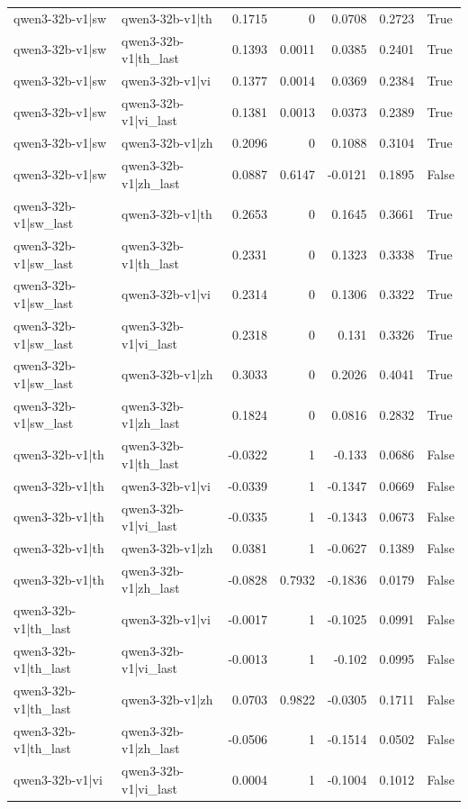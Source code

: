 \begin{table}
\begin{tabular}{l l r r r r l}
qwen3-32b-v1|sw & qwen3-32b-v1|th & 0.1715 & 0 & 0.0708 & 0.2723 & True \\
qwen3-32b-v1|sw & qwen3-32b-v1|th_last & 0.1393 & 0.0011 & 0.0385 & 0.2401 & True \\
qwen3-32b-v1|sw & qwen3-32b-v1|vi & 0.1377 & 0.0014 & 0.0369 & 0.2384 & True \\
qwen3-32b-v1|sw & qwen3-32b-v1|vi_last & 0.1381 & 0.0013 & 0.0373 & 0.2389 & True \\
qwen3-32b-v1|sw & qwen3-32b-v1|zh & 0.2096 & 0 & 0.1088 & 0.3104 & True \\
qwen3-32b-v1|sw & qwen3-32b-v1|zh_last & 0.0887 & 0.6147 & -0.0121 & 0.1895 & False \\
qwen3-32b-v1|sw_last & qwen3-32b-v1|th & 0.2653 & 0 & 0.1645 & 0.3661 & True \\
qwen3-32b-v1|sw_last & qwen3-32b-v1|th_last & 0.2331 & 0 & 0.1323 & 0.3338 & True \\
qwen3-32b-v1|sw_last & qwen3-32b-v1|vi & 0.2314 & 0 & 0.1306 & 0.3322 & True \\
qwen3-32b-v1|sw_last & qwen3-32b-v1|vi_last & 0.2318 & 0 & 0.131 & 0.3326 & True \\
qwen3-32b-v1|sw_last & qwen3-32b-v1|zh & 0.3033 & 0 & 0.2026 & 0.4041 & True \\
qwen3-32b-v1|sw_last & qwen3-32b-v1|zh_last & 0.1824 & 0 & 0.0816 & 0.2832 & True \\
qwen3-32b-v1|th & qwen3-32b-v1|th_last & -0.0322 & 1 & -0.133 & 0.0686 & False \\
qwen3-32b-v1|th & qwen3-32b-v1|vi & -0.0339 & 1 & -0.1347 & 0.0669 & False \\
qwen3-32b-v1|th & qwen3-32b-v1|vi_last & -0.0335 & 1 & -0.1343 & 0.0673 & False \\
qwen3-32b-v1|th & qwen3-32b-v1|zh & 0.0381 & 1 & -0.0627 & 0.1389 & False \\
qwen3-32b-v1|th & qwen3-32b-v1|zh_last & -0.0828 & 0.7932 & -0.1836 & 0.0179 & False \\
qwen3-32b-v1|th_last & qwen3-32b-v1|vi & -0.0017 & 1 & -0.1025 & 0.0991 & False \\
qwen3-32b-v1|th_last & qwen3-32b-v1|vi_last & -0.0013 & 1 & -0.102 & 0.0995 & False \\
qwen3-32b-v1|th_last & qwen3-32b-v1|zh & 0.0703 & 0.9822 & -0.0305 & 0.1711 & False \\
qwen3-32b-v1|th_last & qwen3-32b-v1|zh_last & -0.0506 & 1 & -0.1514 & 0.0502 & False \\
qwen3-32b-v1|vi & qwen3-32b-v1|vi_last & 0.0004 & 1 & -0.1004 & 0.1012 & False \\

\end{tabular}
\end{table}
